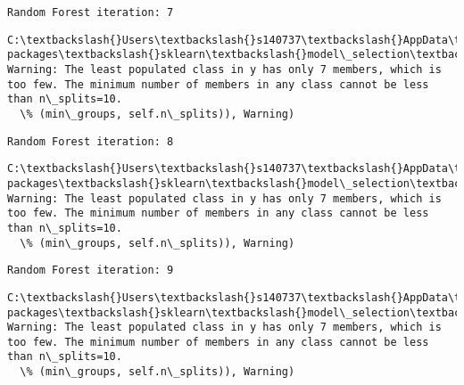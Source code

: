 \documentclass[11pt]{article}
\begin{document}
    \begin{Verbatim}[commandchars=\\\{\}]
Random Forest iteration: 7 

    \end{Verbatim}

    \begin{Verbatim}[commandchars=\\\{\}]
C:\textbackslash{}Users\textbackslash{}s140737\textbackslash{}AppData\textbackslash{}Local\textbackslash{}Continuum\textbackslash{}anaconda3\textbackslash{}lib\textbackslash{}site-packages\textbackslash{}sklearn\textbackslash{}model\_selection\textbackslash{}\_split.py:605: Warning: The least populated class in y has only 7 members, which is too few. The minimum number of members in any class cannot be less than n\_splits=10.
  \% (min\_groups, self.n\_splits)), Warning)

    \end{Verbatim}

    \begin{Verbatim}[commandchars=\\\{\}]
Random Forest iteration: 8 

    \end{Verbatim}

    \begin{Verbatim}[commandchars=\\\{\}]
C:\textbackslash{}Users\textbackslash{}s140737\textbackslash{}AppData\textbackslash{}Local\textbackslash{}Continuum\textbackslash{}anaconda3\textbackslash{}lib\textbackslash{}site-packages\textbackslash{}sklearn\textbackslash{}model\_selection\textbackslash{}\_split.py:605: Warning: The least populated class in y has only 7 members, which is too few. The minimum number of members in any class cannot be less than n\_splits=10.
  \% (min\_groups, self.n\_splits)), Warning)

    \end{Verbatim}

    \begin{Verbatim}[commandchars=\\\{\}]
Random Forest iteration: 9 

    \end{Verbatim}

    \begin{Verbatim}[commandchars=\\\{\}]
C:\textbackslash{}Users\textbackslash{}s140737\textbackslash{}AppData\textbackslash{}Local\textbackslash{}Continuum\textbackslash{}anaconda3\textbackslash{}lib\textbackslash{}site-packages\textbackslash{}sklearn\textbackslash{}model\_selection\textbackslash{}\_split.py:605: Warning: The least populated class in y has only 7 members, which is too few. The minimum number of members in any class cannot be less than n\_splits=10.
  \% (min\_groups, self.n\_splits)), Warning)

    \end{Verbatim}
\end{document}
